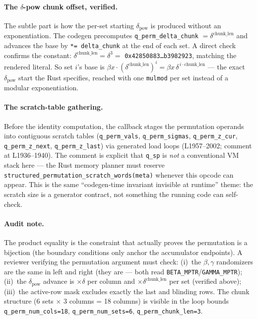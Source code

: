 \paragraph{The \(\delta\)-pow chunk offset, verified.}
The subtle part is how the per-set starting $\delta_{\text{pow}}$
is produced without an exponentiation. The codegen precomputes
\texttt{q\_\allowbreak{}perm\_\allowbreak{}delta\_\allowbreak{}chunk} $=\delta^{\text{chunk\_len}}$ and
advances the base by \texttt{*= delta\_chunk} at the end of each
set. A direct check confirms the constant:
$\delta^{\text{chunk\_len}}=\delta^3=$
\texttt{0x42850883\ldots b3982923}, matching the rendered
literal. So set $i$'s base is
$\beta x\cdot(\delta^{\text{chunk\_len}})^i=
\beta x\,\delta^{\,i\cdot\text{chunk\_len}}$ --- the exact
$\delta_{\text{pow}}$ start the Rust specifies, reached with one
\texttt{mulmod} per set instead of a modular exponentiation.

\paragraph{The scratch-table gathering.} Before the identity
computation, the callback stages the permutation operands into
contiguous scratch tables (\texttt{q\_perm\_vals},
\texttt{q\_perm\_sigmas}, \texttt{q\_perm\_z\_cur},
\texttt{q\_perm\_z\_next}, \texttt{q\_perm\_z\_last}) via
generated load loops (L1957--2002; comment at L1936--1940). The comment is explicit that
\texttt{q\_sp} is \emph{not} a conventional VM stack here ---
the Rust memory planner must reserve
\texttt{structured\_\allowbreak{}permutation\_\allowbreak{}scratch\_\allowbreak{}words(meta)} whenever
this opcode can appear. This is the same ``codegen-time invariant
invisible at runtime'' theme: the scratch size is a generator
contract, not something the running code can self-check.

\paragraph{Audit note.} The product equality is the constraint
that actually proves the permutation is a bijection (the boundary
conditions only anchor the accumulator endpoints). A reviewer
verifying the permutation argument must check:
(i)~the $\beta,\gamma$ randomizers are the same in left and right
(they are --- both read \texttt{BETA\_MPTR}/\texttt{GAMMA\_MPTR});
(ii)~the $\delta_{\text{pow}}$ advance is $\times\delta$ per
column and $\times\delta^{\text{chunk\_len}}$ per set (verified
above); (iii)~the active-row mask excludes exactly the last and
blinding rows. The chunk structure (6 sets $\times$ 3 columns =
18 columns) is visible in the loop bounds
\texttt{q\_\allowbreak{}perm\_\allowbreak{}num\_\allowbreak{}cols=18}, \texttt{q\_\allowbreak{}perm\_\allowbreak{}num\_\allowbreak{}sets=6},
\texttt{q\_\allowbreak{}perm\_\allowbreak{}chunk\_\allowbreak{}len=3}.

